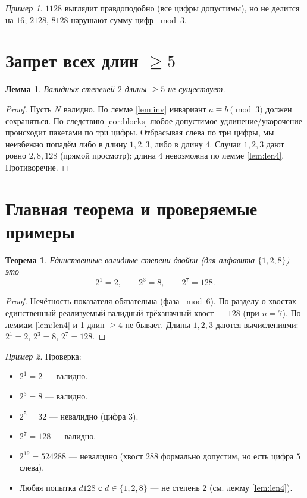 \documentclass[12pt]{article}
\theoremstyle{plain}
\newtheorem{theorem}{Теорема}
\newtheorem{lemma}{Лемма}
\theoremstyle{remark}
\newtheorem*{example}{Пример}
\begin{document}
\begin{example}
$1128$ выглядит правдоподобно (все цифры допустимы), но не делится на $16$; $2128$, $8128$ нарушают сумму цифр $\bmod3$.
\end{example}

\section{Запрет всех длин $\ge5$}
\begin{lemma}\label{lem:len5}
Валидных степеней $2$ длины $\ge5$ не существует.
\end{lemma}

\begin{proof}
Пусть $N$ валидно. По лемме \ref{lem:inv} инвариант $a\equiv b\pmod3$ должен сохраняться. По следствию \ref{cor:blocks} любое допустимое удлинение/укорочение происходит пакетами по три цифры. Отбрасывая слева по три цифры, мы неизбежно попадём либо в длину $1,2,3$, либо в длину $4$. Случаи $1,2,3$ дают ровно $2,8,128$ (прямой просмотр); длина $4$ невозможна по лемме \ref{lem:len4}. Противоречие.
\end{proof}

\section{Главная теорема и проверяемые примеры}
\begin{theorem}
Единственные валидные степени двойки (для алфавита $\{1,2,8\}$) — это
\[
2^1=2,\qquad 2^3=8,\qquad 2^7=128.
\]
\end{theorem}

\begin{proof}
Нечётность показателя обязательна (фаза $\bmod 6$). По разделу о хвостах единственный реализуемый валидный трёхзначный хвост — $128$ (при $n=7$). По леммам \ref{lem:len4} и \ref{lem:len5} длин $\ge4$ не бывает. Длины $1,2,3$ даются вычислениями: $2^1=2$, $2^3=8$, $2^7=128$.
\end{proof}

\begin{example}
Проверка:
\begin{itemize}[nosep]
\item $2^1=2$ — валидно.
\item $2^3=8$ — валидно.
\item $2^5=32$ — невалидно (цифра $3$).
\item $2^7=128$ — валидно.
\item $2^{19}=524288$ — невалидно (хвост $288$ формально допустим, но есть цифра $5$ слева).
\item Любая попытка $d128$ с $d\in\{1,2,8\}$ — не степень $2$ (см. лемму \ref{lem:len4}).
\end{itemize}
\end{example}
\end{document}
